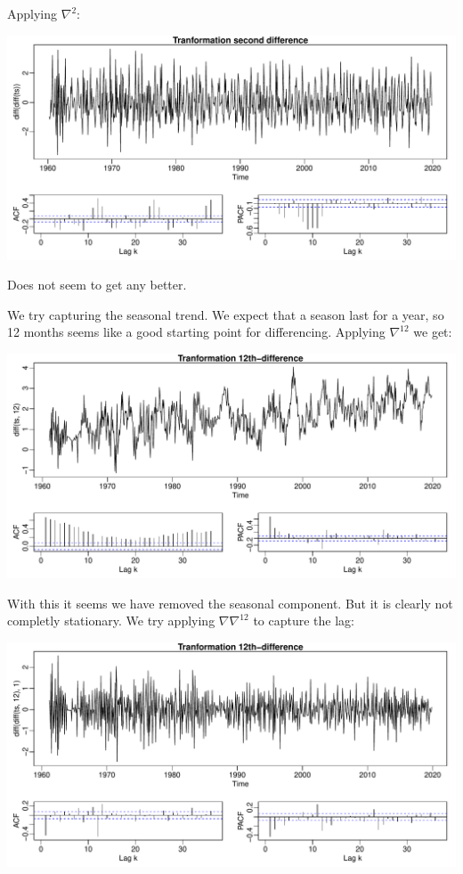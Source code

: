 \documentclass[]{article}
\begin{document}
Applying \(\nabla^2\):

\begin{center}\includegraphics{Tidsrekkerex4_files/figure-latex/unnamed-chunk-7-1} \end{center}

Does not seem to get any better.

We try capturing the seasonal trend. We expect that a season last for a
year, so 12 months seems like a good starting point for differencing.
Applying \(\nabla^{12}\) we get:

\begin{center}\includegraphics{Tidsrekkerex4_files/figure-latex/unnamed-chunk-8-1} \end{center}

With this it seems we have removed the seasonal component. But it is
clearly not completly stationary. We try applying \(\nabla\nabla^{12}\)
to capture the lag:

\begin{center}\includegraphics{Tidsrekkerex4_files/figure-latex/unnamed-chunk-9-1} \end{center}
\end{document}
